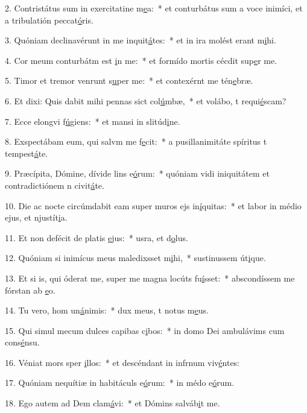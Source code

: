 2. Contristátus sum in exercitatine m\uline{e}a:~* et conturbátus sum a voce inimíci, et a tribulatión peccat\uline{ó}ris.\par 
3. Quóniam declinavérunt in me inquit\uline{á}tes:~* et in ira molést erant m\uline{i}hi.\par 
4. Cor meum conturbátm est \uline{i}n me:~* et formído mortis cécdit sup\uline{e}r me.\par 
5. Timor et tremor venrunt s\uline{u}per me:~* et contexérnt me tén\uline{e}bræ.\par 
6. Et dixi: Quis dabit mihi pennas sict col\uline{ú}mbæ,~* et volábo, t requi\uline{é}scam?\par 
7. Ecce elongvi f\uline{ú}giens:~* et mansi in slitúd\uline{i}ne.\par 
8. Exspectábam eum, qui salvm me f\uline{e}cit:~* a pusillanimitáte spíritus t tempest\uline{á}te.\par 
9. Præcípita, Dómine, dívide lins e\uline{ó}rum:~* quóniam vidi iniquitátem et contradictiónem n civit\uline{á}te.\par 
10. Die ac nocte circúmdabit eam super muros ejs in\uline{í}quitas:~* et labor in médio ejus, et njustít\uline{i}a.\par 
11. Et non defécit de platis \uline{e}jus:~* usra, et d\uline{o}lus.\par 
12. Quóniam si inimícus meus maledixsset m\uline{i}hi,~* sustinussem út\uline{i}que.\par 
13. Et si is, qui óderat me, super me magna locúts fu\uline{í}sset:~* abscondíssem me fórstan ab \uline{e}o.\par 
14. Tu vero, hom un\uline{á}nimis:~* dux meus, t notus m\uline{e}us.\par 
15. Qui simul mecum dulces capibas c\uline{i}bos:~* in domo Dei ambulávims cum cons\uline{é}nsu.\par 
16. Véniat mors sper \uline{i}llos:~* et descéndant in infrnum viv\uline{é}ntes:\par 
17. Quóniam nequítiæ in habitáculs e\uline{ó}rum:~* in médo e\uline{ó}rum.\par 
18. Ego autem ad Dem clam\uline{á}vi:~* et Dómins salváb\uline{i}t me.\par 
